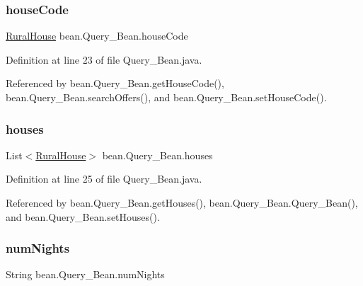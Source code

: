 \subsubsection{\texorpdfstring{houseCode}{houseCode}}
{\footnotesize\ttfamily \mbox{\hyperlink{classdomain_1_1RuralHouse}{Rural\+House}} bean.\+Query\+\_\+\+Bean.\+house\+Code\hspace{0.3cm}{\ttfamily [package]}}



Definition at line 23 of file Query\+\_\+\+Bean.\+java.



Referenced by bean.\+Query\+\_\+\+Bean.\+get\+House\+Code(), bean.\+Query\+\_\+\+Bean.\+search\+Offers(), and bean.\+Query\+\_\+\+Bean.\+set\+House\+Code().

\mbox{\label{classbean_1_1Query__Bean_a8c158c927390375bed7935b2db5e4f53}} 
\subsubsection{\texorpdfstring{houses}{houses}}
{\footnotesize\ttfamily List$<$\mbox{\hyperlink{classdomain_1_1RuralHouse}{Rural\+House}}$>$ bean.\+Query\+\_\+\+Bean.\+houses\hspace{0.3cm}{\ttfamily [package]}}



Definition at line 25 of file Query\+\_\+\+Bean.\+java.



Referenced by bean.\+Query\+\_\+\+Bean.\+get\+Houses(), bean.\+Query\+\_\+\+Bean.\+Query\+\_\+\+Bean(), and bean.\+Query\+\_\+\+Bean.\+set\+Houses().

\mbox{\label{classbean_1_1Query__Bean_a76fd38e1297497efc591fc46a6ae64f4}} 
\subsubsection{\texorpdfstring{numNights}{numNights}}
{\footnotesize\ttfamily String bean.\+Query\+\_\+\+Bean.\+num\+Nights\hspace{0.3cm}{\ttfamily [package]}}



